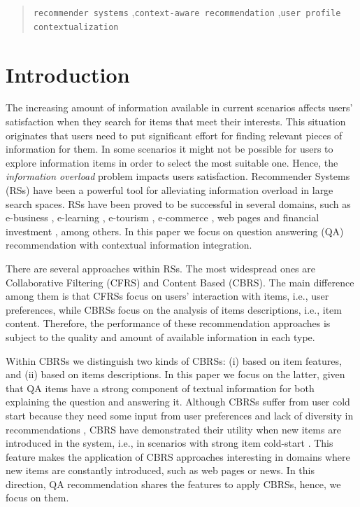 \documentclass[preprint]{elsarticle}
\begin{document}
\begin{spacing}{1.5}
\begin{frontmatter}
\begin{abstract}
\begin{keyword}
   \texttt{recommender systems} \sep \texttt{context-aware recommendation} \sep \texttt{user profile contextualization}
\end{keyword}
\end{abstract}

\end{frontmatter}

\section{Introduction}\label{sec:introduction}

The increasing amount of information available in current scenarios affects users' satisfaction when they search for items that meet their interests. This situation originates that users need to put significant effort for finding relevant pieces of information for them. In some scenarios it might not be possible for users to explore information items in order to select the most suitable one. Hence, the \emph{information overload} problem impacts users satisfaction. Recommender Systems (RSs) have been a powerful tool for alleviating information overload in large search spaces. RSs have been proved to be successful in several domains, such as e-business \cite{Lu2013}, e-learning \cite{Wu2015,Yera2014}, e-tourism \cite{AlHassan2015,Noguera2012}, e-commerce \cite{Rafailidis2016}, web pages \cite{Nguyen2014,Xuan2015} and financial investment \cite{Musto2015}, among others. In this paper we focus on question answering (QA) recommendation with contextual information integration.

There are several approaches within RSs. The most widespread ones are Collaborative Filtering (CFRS) and Content Based (CBRS). The main difference among them is that CFRSs focus on users' interaction with items, i.e., user preferences, while CBRSs focus on the analysis of items descriptions, i.e., item content. Therefore, the performance of these recommendation approaches is subject to the quality and amount of available information in each type.

Within CBRSs we distinguish two kinds of CBRSs: (i) based on item features, and (ii) based on items descriptions. In this paper we focus on the latter, given that QA items have a strong component of textual information for both explaining the question and answering it. Although CBRSs suffer from user cold start because they need some input from user preferences and lack of diversity in recommendations \cite{Barragans2010}, CBRS have demonstrated their utility when new items are introduced in the system, i.e., in scenarios with strong item cold-start \cite{Aggarwal2016}. This feature makes the application of CBRS approaches interesting in domains where new items are constantly introduced, such as web pages or news. In this direction, QA recommendation shares the features to apply CBRSs, hence, we focus on them.


\end{spacing}
\end{document}
